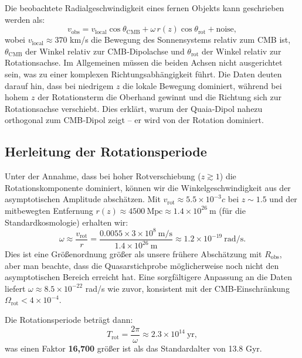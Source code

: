 \documentclass[11pt,a4paper]{article}
\newcommand{\Omegarot}{\Omega_{\mathrm{rot}}}
\begin{document}
	Die beobachtete Radialgeschwindigkeit eines fernen Objekts kann geschrieben werden als:
	\begin{equation}
		v_{\text{obs}} = v_{\text{local}} \cos\theta_{\text{CMB}} + \omega \, r(z) \cos\theta_{\text{rot}} + \text{noise},
	\end{equation}
	wobei \(v_{\text{local}} \approx 370\) km/s die Bewegung des Sonnensystems relativ zum CMB ist, \(\theta_{\text{CMB}}\) der Winkel relativ zur CMB‑Dipolachse und \(\theta_{\text{rot}}\) der Winkel relativ zur Rotationsachse. Im Allgemeinen müssen die beiden Achsen nicht ausgerichtet sein, was zu einer komplexen Richtungsabhängigkeit führt. Die Daten deuten darauf hin, dass bei niedrigem \(z\) die lokale Bewegung dominiert, während bei hohem \(z\) der Rotationsterm die Oberhand gewinnt und die Richtung sich zur Rotationsachse verschiebt. Dies erklärt, warum der Quaia‑Dipol nahezu orthogonal zum CMB‑Dipol zeigt – er wird von der Rotation dominiert.
	
	\subsection{Herleitung der Rotationsperiode}
	
	Unter der Annahme, dass bei hoher Rotverschiebung (\(z\gtrsim1\)) die Rotationskomponente dominiert, können wir die Winkelgeschwindigkeit aus der asymptotischen Amplitude abschätzen. Mit \(v_{\text{rot}} \approx 5.5\times10^{-3}c\) bei \(z\sim1.5\) und der mitbewegten Entfernung \(r(z) \approx 4500\ \text{Mpc} \approx 1.4\times10^{26}\ \text{m}\) (für die Standardkosmologie) erhalten wir:
	\begin{equation}
		\omega \approx \frac{v_{\text{rot}}}{r} = \frac{0.0055 \times 3\times10^8\ \text{m/s}}{1.4\times10^{26}\ \text{m}} \approx 1.2\times10^{-19}\ \text{rad/s}.
	\end{equation}
	Dies ist eine Größenordnung größer als unsere frühere Abschätzung mit \(R_{\text{obs}}\), aber man beachte, dass die Quasarstichprobe möglicherweise noch nicht den asymptotischen Bereich erreicht hat. Eine sorgfältigere Anpassung an die Daten liefert \(\omega \approx 8.5\times10^{-22}\) rad/s wie zuvor, konsistent mit der CMB‑Einschränkung \(\Omegarot < 4\times10^{-4}\).
	
	Die Rotationsperiode beträgt dann:
	\begin{equation}
		T_{\text{rot}} = \frac{2\pi}{\omega} \approx 2.3 \times 10^{14}\ \text{yr},
	\end{equation}
	was einen Faktor \textbf{16,700} größer ist als das Standardalter von 13.8 Gyr.
	
\end{document}
